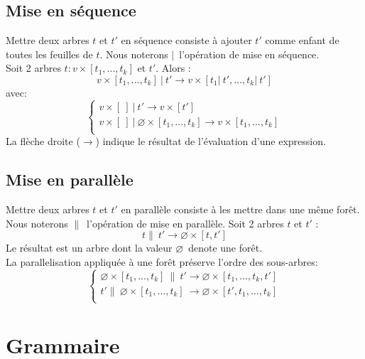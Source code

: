 \documentclass{article}
\newcommand{\llist}	[1]		{\ensuremath{[#1_1,...,#1_k]}}
\newcommand{\seq}		{\ensuremath{|}}
\newcommand{\paral}		{\ensuremath{\parallel}}
\newcommand{\forest}	{\ensuremath{\varnothing}}
\newcommand{\etc}		{\ensuremath{\text{…}}}
\newcommand{\emptyf}	{\ensuremath{[\ ]}}
\begin{document}
\subsection{Mise en séquence}
Mettre deux arbres $t$ et $t'$ en séquence consiste à ajouter $t'$ comme enfant de toutes les feuilles de $t$.
Nous noterons \seq\ l'opération de mise en séquence. \\
Soit 2 arbres $t : v \times \llist{t}$ et $t'$. Alors :
\[
	v \times \llist{t}\ \seq\ t'  \to  v  \times [t_1 \seq\ t',\etc, t_k \seq\ t']
\]
avec: 
\[
\left\{
\begin{array}{l}
	v \times \emptyf\ \seq\ t'  \to  v  \times [ t' ]\\
	v \times \emptyf\ \seq\ \forest \times \llist{t}  \to  v  \times \llist{t}\\
\end{array}
\right.
\]
La flèche droite ($\to$) indique le résultat de l'évaluation d'une expression.

\subsection{Mise en parallèle}
Mettre deux arbres $t$ et $t'$ en parallèle consiste à les mettre dans une même forêt.
Nous noterons \paral\ l'opération de mise en parallèle. 
Soit 2 arbres $t$ et $t'$ :
\[
	t \paral\ t'  \to  \forest \times [ t, t' ]
\]
Le résultat est un arbre dont la valeur \forest\ denote une forêt. \\
La parallelisation appliquée à une forêt préserve l'ordre des sous-arbres:
\[
\left\{
\begin{array}{l}
	\forest \times \llist{t}\  \paral\ t'  \to  \forest \times [t_1,\etc,t_k,t']\\
	t' \paral\ \forest \times \llist{t}\   \to  \forest \times [t',t_1,\etc,t_k]\\
\end{array}
\right.
\]


\section{Grammaire}\label{agram}
\end{document}
